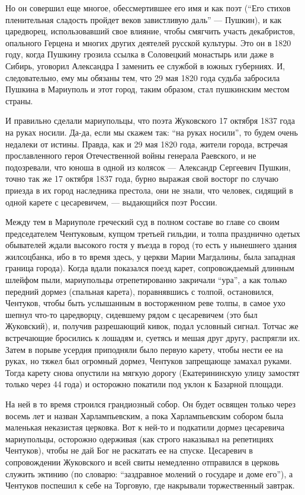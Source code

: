 Но он совершил еще многое, обессмертившее его имя и как поэт (\enquote{Его стихов
пленительная сладость пройдет веков завистливую даль} — Пушкин), и как
царедворец, использовавший свое влияние, чтобы смягчить участь декабристов,
опального Герцена и многих других деятелей русской культуры. Это он в 1820
году, когда Пушкину грозила ссылка в Соловецкий монастырь или даже в Сибирь,
уговорил Александра I заменить ее службой в южных губерниях. И, следовательно,
ему мы обязаны тем, что 29 мая 1820 года судьба забросила Пушкина в Мариуполь и
этот город, таким образом, стал пушкинским местом страны.

И правильно сделали мариупольцы, что поэта Жуковского 17 октября 1837 года на
руках носили. Да-да, если мы скажем так: \enquote{на руках носили}, то будем
очень недалеки от истины. Правда, как и 29 мая 1820 года, жители города,
встречая прославленного героя Отечественной войны генерала Раевского, и не
подозревали, что юноша в одной из колясок — Александр Сергеевич Пушкин, точно
так же 17 октября 1837 года, бурно выражая свой восторг по случаю приезда в их
город наследника престола, они не знали, что человек, сидящий в одной карете с
цесаревичем, — выдающийся поэт России.

Между тем в Мариуполе греческий суд в полном составе во главе со своим
председателем Чентуковым, купцом третьей гильдии, и толпа празднично одетых
обывателей ждали высокого гостя у въезда в город (то есть у нынешнего здания
жилсоцбанка, ибо в то время здесь, у церкви Марии Магдалины, была западная
граница города). Когда вдали показался поезд карет, сопровождаемый длинным
шлейфом пыли, мариупольцы отрепетированно закричали \enquote{ура}, а как только
передний дормез (спальная карета), поравнявшись с толпой, остановился,
Чентуков, чтобы быть услышанным в восторженном реве толпы, в самое ухо шепнул
что-то царедворцу, сидевшему рядом с цесаревичем (это был Жуковский), и,
получив разрешающий кивок, подал условный сигнал. Тотчас же встречающие
бросились к лошадям и, суетясь и мешая друг другу, распрягли их. Затем в порыве
усердия приподняли было первую карету, чтобы нести ее на руках, но тяжел был
огромный дормез, Чентуков запрещающе замахал руками. Тогда карету снова
опустили на мягкую дорогу (Екатерининскую улицу замостят только через 44 года)
и осторожно покатили под уклон к Базарной площади.

На ней в то время строился грандиозный собор. Он будет освящен только через
восемь лет и назван Харлампьевским, а пока Харлампьевским собором была
маленькая неказистая церковка. Вот к ней-то и подкатили дормез цесаревича
мариупольцы, осторожно одерживая (как строго наказывал на репетициях Чентуков),
чтобы не дай Бог не раскатать ее на спуске. Цесаревич в сопровождении
Жуковского и всей свиты немедленно отправился в церковь служить эктинию (по
словарю: \enquote{заздравное молений о государе и доме его}), а Чентуков
поспешил к себе на Торговую, где накрывали торжественный завтрак.

